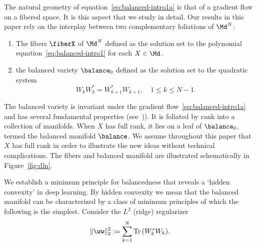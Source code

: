 The natural geometry of equation~\eqref{eq:balanced-intro1a} is that of a gradient flow on a fibered space. It is this aspect that we study in detail. Our results in this paper rely on the interplay between two complementary foliations of $\Md^N$: 
\begin{enumerate}
    \item The 
fibers $\fiberX$ of $\Md^N$ defined as the solution set to the polynomial equation~\eqref{eq:balanced-intro1} for each $X \in \Md$. 
\item the balanced variety 
$\balance_0$ defined as the solution set to the quadratic system 
\begin{equation}
    \label{eq:balanced-intro2}
     W_kW_k^* = W_{k+1}^*W_{k+1}, \quad 1\leq k \leq N-1.
\end{equation}
\end{enumerate}
The balanced variety is invariant under the gradient flow~\eqref{eq:balanced-intro1a} and has several fundamental properties (see~\cite[Thms. 2-8]{MY-dln})). It is foliated by rank into a collection of manifolds. When $X$ has full rank, it lies on a leaf of $\balance_0$, termed the balanced manifold $\balance$. We assume throughout this paper that $X$ has full rank in order to illustrate the new ideas without technical complications. The fibers and balanced manifold are illustrated schematically in Figure~\ref{fig:dln}.





We establish a minimum principle for balancedness that reveals a `hidden convexity' in deep learning. By hidden convexity we mean that the balanced manifold can be characterized by a class of minimum principles of which the following is the simplest. Consider the $L^2$ (ridge) regularizer 
\begin{equation}
    \label{eq:ridge}
    \|\ww\|_2^2 := \sum_{k=1}^N \Tr (W_k^* W_k).
\end{equation}

